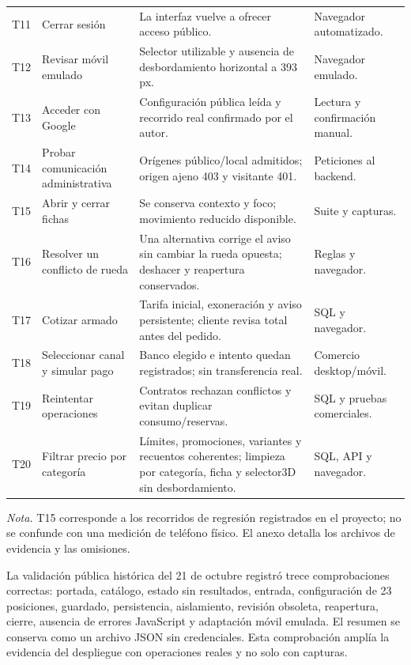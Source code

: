 \documentclass[12pt,letterpaper]{article}
\newcommand{\nota}[1]{\par{\normalfont\normalsize\doublespacing\raggedright\setlength{\parindent}{0pt}\noindent\textit{Nota.} #1\par}}
\newenvironment{tabla}{\par\begingroup\normalsize\singlespacing\setlength{\tabcolsep}{5pt}\renewcommand{\arraystretch}{1.25}}{\par\endgroup}
\begin{document}
\begin{tabla}
\begin{longtable}{L{.9cm}L{4.6cm}L{5.8cm}L{2.9cm}}
T11 & Cerrar sesión & La interfaz vuelve a ofrecer acceso público. & Navegador automatizado.\\
T12 & Revisar móvil emulado & Selector utilizable y ausencia de desbordamiento horizontal a 393 px. & Navegador emulado.\\
T13 & Acceder con Google & Configuración pública leída y recorrido real confirmado por el autor. & Lectura y confirmación manual.\\
T14 & Probar comunicación administrativa & Orígenes público/local admitidos; origen ajeno 403 y visitante 401. & Peticiones al backend.\\
T15 & Abrir y cerrar fichas & Se conserva contexto y foco; movimiento reducido disponible. & Suite y capturas.\\
T16 & Resolver un conflicto de rueda & Una alternativa corrige el aviso sin cambiar la rueda opuesta; deshacer y reapertura conservados. & Reglas y navegador.\\
T17 & Cotizar armado & Tarifa inicial, exoneración y aviso persistente; cliente revisa total antes del pedido. & SQL y navegador.\\
T18 & Seleccionar canal y simular pago & Banco elegido e intento quedan registrados; sin transferencia real. & Comercio desktop/móvil.\\
T19 & Reintentar operaciones & Contratos rechazan conflictos y evitan duplicar consumo/reservas. & SQL y pruebas comerciales.\\
T20 & Filtrar precio por categoría & Límites, promociones, variantes y recuentos coherentes; limpieza por categoría, ficha y selector3D sin desbordamiento. & SQL, API y navegador.\\\bottomrule
\end{longtable}\end{tabla}
\nota{T15 corresponde a los recorridos de regresión registrados en el proyecto; no se confunde con una medición de teléfono físico. El anexo detalla los archivos de evidencia y las omisiones.}

La validación pública histórica del 21 de octubre registró trece comprobaciones correctas: portada, catálogo, estado sin resultados, entrada, configuración de 23 posiciones, guardado, persistencia, aislamiento, revisión obsoleta, reapertura, cierre, ausencia de errores JavaScript y adaptación móvil emulada. El resumen se conserva como un archivo JSON sin credenciales. Esta comprobación amplía la evidencia del despliegue con operaciones reales y no solo con capturas.
\end{document}
